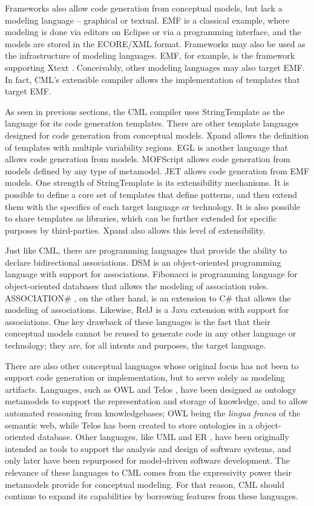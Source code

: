 Frameworks also allow code generation from conceptual models, but lack a modeling language -- graphical or textual.
EMF \cite{emf} is a classical example,
where modeling is done via editors on Eclipse or via a programming interface,
and the models are stored in the ECORE/XML format.
Frameworks may also be used as the infrastructure of modeling languages.
EMF, for example, is the framework supporting Xtext \cite{xtext}.
Conceivably, other modeling languages may also target EMF.
In fact, CML's extensible compiler allows the implementation of templates that target EMF.

As seen in previous sections,
the CML compiler uses StringTemplate \cite{st} as the language for its code generation templates.
There are other template languages designed for code generation from conceptual models.
Xpand \cite{xpand} allows the definition of templates with multiple variability regions.
EGL \cite{egl} is another language that allows code generation from models.
MOFScript \cite{mofscript} allows code generation from models defined
by any type of metamodel.
JET \cite{jet} allows code generation from EMF \cite{emf} models.
One strength of StringTemplate is its extensibility mechanisms.
It is possible to define a core set of templates that define patterns,
and then extend them with the specifics of each target language or technology.
It is also possible to share templates as libraries,
which can be further extended for specific purposes by third-parties.
Xpand also allows this level of extensibility.

Just like CML, there are programming languages
that provide the ability to declare bidirectional associations.
DSM \cite{balzer} is an object-oriented programming language with support for associations.
Fibonacci \cite{fibonacci}  is programming language for object-oriented databases
that allows the modeling of association roles.
ASSOCIATION\# \cite{cardoso}, on the other hand,
is an extension to C\# that allows the modeling of associations.
Likewise, RelJ \cite{bierman} is a Java extension with support for associations.
One key drawback of these languages is the fact that their conceptual models
cannot be reused to generate code in any other language or technology;
they are, for all intents and purposes, the target language.

There are also other conceptual languages
whose original focus has not been to support code generation or implementation,
but to serve solely as modeling artifacts.
Languages, such as OWL \cite{owl2} and Telos \cite{telos},
have been designed as ontology metamodels
to support the representation and storage of knowledge,
and to allow automated reasoning from knowledgebases;
OWL being the \emph{lingua franca} of the semantic web,
while Telos has been created to store ontologies in a object-oriented database.
Other languages, like UML \cite{uml} and ER \cite{er},
have been originally intended as tools to support the analysis and design of software systems,
and only later have been repurposed for model-driven software development.
The relevance of these languages to CML comes from the expressivity power
their metamodels provide for conceptual modeling.
For that reason,
CML should continue to expand its capabilities
by borrowing features from these languages.
